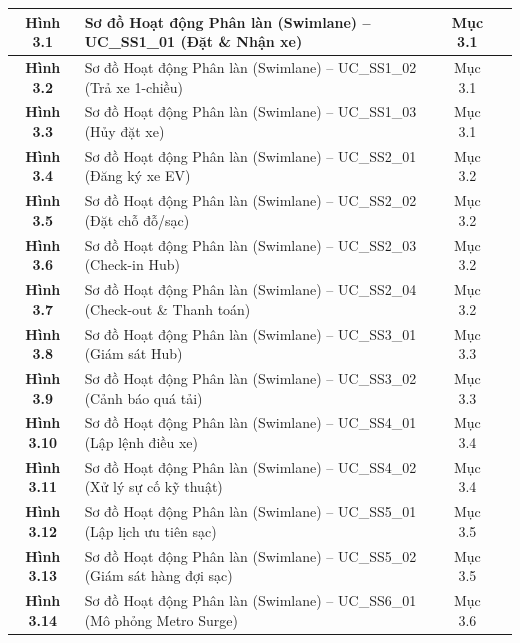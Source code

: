 \documentclass[12pt,a4paper]{article}
\begin{document}
\begin{longtable}{|c|p{8.5cm}|c|c|}
    \hline
    \textbf{Hình 3.1} & Sơ đồ Hoạt động Phân làn (Swimlane) -- UC\_SS1\_01 (Đặt \& Nhận xe) & Mục 3.1 & \pageref{fig:act-ss1-01} \\
    \hline
    \textbf{Hình 3.2} & Sơ đồ Hoạt động Phân làn (Swimlane) -- UC\_SS1\_02 (Trả xe 1-chiều) & Mục 3.1 & \pageref{fig:act-ss1-02} \\
    \hline
    \textbf{Hình 3.3} & Sơ đồ Hoạt động Phân làn (Swimlane) -- UC\_SS1\_03 (Hủy đặt xe) & Mục 3.1 & \pageref{fig:act-ss1-03} \\
    \hline
    \textbf{Hình 3.4} & Sơ đồ Hoạt động Phân làn (Swimlane) -- UC\_SS2\_01 (Đăng ký xe EV) & Mục 3.2 & \pageref{fig:act-ss2-01} \\
    \hline
    \textbf{Hình 3.5} & Sơ đồ Hoạt động Phân làn (Swimlane) -- UC\_SS2\_02 (Đặt chỗ đỗ/sạc) & Mục 3.2 & \pageref{fig:act-ss2-02} \\
    \hline
    \textbf{Hình 3.6} & Sơ đồ Hoạt động Phân làn (Swimlane) -- UC\_SS2\_03 (Check-in Hub) & Mục 3.2 & \pageref{fig:act-ss2-03} \\
    \hline
    \textbf{Hình 3.7} & Sơ đồ Hoạt động Phân làn (Swimlane) -- UC\_SS2\_04 (Check-out \& Thanh toán) & Mục 3.2 & \pageref{fig:act-ss2-04} \\
    \hline
    \textbf{Hình 3.8} & Sơ đồ Hoạt động Phân làn (Swimlane) -- UC\_SS3\_01 (Giám sát Hub) & Mục 3.3 & \pageref{fig:act-ss3-01} \\
    \hline
    \textbf{Hình 3.9} & Sơ đồ Hoạt động Phân làn (Swimlane) -- UC\_SS3\_02 (Cảnh báo quá tải) & Mục 3.3 & \pageref{fig:act-ss3-02} \\
    \hline
    \textbf{Hình 3.10} & Sơ đồ Hoạt động Phân làn (Swimlane) -- UC\_SS4\_01 (Lập lệnh điều xe) & Mục 3.4 & \pageref{fig:act-ss4-01} \\
    \hline
    \textbf{Hình 3.11} & Sơ đồ Hoạt động Phân làn (Swimlane) -- UC\_SS4\_02 (Xử lý sự cố kỹ thuật) & Mục 3.4 & \pageref{fig:act-ss4-02} \\
    \hline
    \textbf{Hình 3.12} & Sơ đồ Hoạt động Phân làn (Swimlane) -- UC\_SS5\_01 (Lập lịch ưu tiên sạc) & Mục 3.5 & \pageref{fig:act-ss5-01} \\
    \hline
    \textbf{Hình 3.13} & Sơ đồ Hoạt động Phân làn (Swimlane) -- UC\_SS5\_02 (Giám sát hàng đợi sạc) & Mục 3.5 & \pageref{fig:act-ss5-02} \\
    \hline
    \textbf{Hình 3.14} & Sơ đồ Hoạt động Phân làn (Swimlane) -- UC\_SS6\_01 (Mô phỏng Metro Surge) & Mục 3.6 & \pageref{fig:act-ss6-01} \\
    \hline

\end{longtable}
\end{document}

